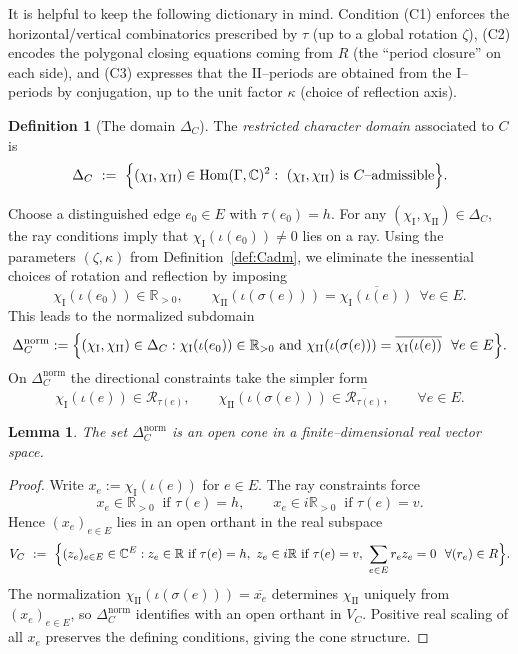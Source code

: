 \documentclass[a4paper,12pt]{amsart}
\newcommand{\C}{\mathbb{C}}
\newcommand{\R}{\mathbb{R}}
\newcommand{\Hom}{\operatorname{Hom}}
\theoremstyle{plain}
\newtheorem{lemma}[theorem]{Lemma}
\theoremstyle{definition}
\newtheorem{definition}[theorem]{Definition}
\begin{document}
It is helpful to keep the following dictionary in mind.
Condition \textup{(C1)} enforces the horizontal/vertical combinatorics prescribed by $\tau$ (up to a global rotation $\zeta$),
\textup{(C2)} encodes the polygonal closing equations coming from $R$ (the ``period closure'' on each side),
and \textup{(C3)} expresses that the $\mathrm{II}$--periods are obtained from the $\mathrm{I}$--periods by conjugation, up to the
unit factor $\kappa$ (choice of reflection axis).

\begin{definition}[The domain $\Delta_C$]\label{def:DeltaC}
The \emph{restricted character domain} associated to $C$ is
\[
\Delta_C\ :=\ \Bigl\{(\chi_{\mathrm{I}},\chi_{\mathrm{II}})\in\Hom(\Gamma,\C)^2:\ (\chi_{\mathrm{I}},\chi_{\mathrm{II}})
\text{ is $C$--admissible}\Bigr\}.
\]
\end{definition}
\medskip

Choose a distinguished edge $e_0\in E$ with $\tau(e_0)=h$.
For any $(\chi_{\mathrm{I}},\chi_{\mathrm{II}})\in\Delta_C$, the ray conditions imply that
$\chi_{\mathrm{I}}(\iota(e_0))\neq 0$ lies on a ray.  Using the parameters $(\zeta,\kappa)$ from
Definition~\ref{def:Cadm}, we eliminate the inessential choices of rotation and reflection by imposing
\[
\chi_{\mathrm{I}}(\iota(e_0))\in\R_{>0},
\qquad
\chi_{\mathrm{II}}(\iota(\sigma(e)))=\overline{\chi_{\mathrm{I}}(\iota(e))}\ \ \forall e\in E .
\]
This leads to the normalized subdomain
\[
\Delta_C^{\mathrm{norm}}
:=\Bigl\{(\chi_{\mathrm{I}},\chi_{\mathrm{II}})\in \Delta_C:
\chi_{\mathrm{I}}(\iota(e_0))\in\R_{>0}
\ \text{and}\ 
\chi_{\mathrm{II}}(\iota(\sigma(e)))=\overline{\chi_{\mathrm{I}}(\iota(e))}\ \ \forall e\in E
\Bigr\}.
\]
On $\Delta_C^{\mathrm{norm}}$ the directional constraints take the simpler form
\[
\chi_{\mathrm{I}}(\iota(e))\in \mathcal R_{\tau(e)},
\qquad
\chi_{\mathrm{II}}(\iota(\sigma(e)))\in \overline{\mathcal R_{\tau(e)}},
\qquad \forall e\in E.
\]

\begin{lemma}\label{lem:opencone}
The set $\Delta_C^{\mathrm{norm}}$ is an open cone in a finite--dimensional real vector space.
\end{lemma}

\begin{proof}
Write $x_e:=\chi_{\mathrm{I}}(\iota(e))$ for $e\in E$.  The ray constraints force
\[
x_e\in\R_{>0}\ \text{ if }\tau(e)=h,\qquad x_e\in i\R_{>0}\ \text{ if }\tau(e)=v.
\]
Hence $(x_e)_{e\in E}$ lies in an open orthant in the real subspace
\[
V_C\ :=\ \Bigl\{(z_e)_{e\in E}\in\C^E:
z_e\in\R \text{ if }\tau(e)=h,\ z_e\in i\R \text{ if }\tau(e)=v,\
\sum_{e\in E} r_e z_e=0\ \ \forall (r_e)\in R\Bigr\}.
\]
The normalization $\chi_{\mathrm{II}}(\iota(\sigma(e)))=\overline{x_e}$ determines $\chi_{\mathrm{II}}$ uniquely from $(x_e)_{e\in E}$,
so $\Delta_C^{\mathrm{norm}}$ identifies with an open orthant in $V_C$.  Positive real scaling of all $x_e$ preserves the defining
conditions, giving the cone structure.
\end{proof}
\end{document}
